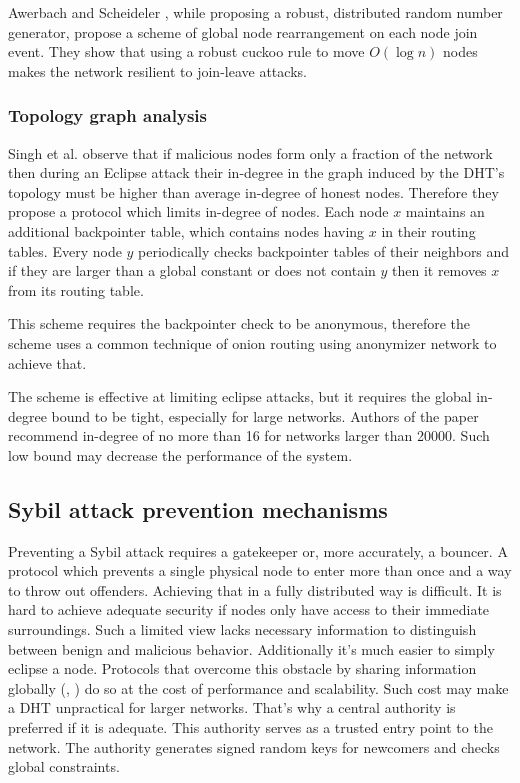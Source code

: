   Awerbach and Scheideler \cite{awe10}, while proposing a robust, distributed
  random number generator, propose a scheme of global node rearrangement on each
  node join event. They show that using a robust cuckoo rule to move $O(\log n)$
  nodes makes the network resilient to join-leave attacks.

  \subsubsection{Topology graph analysis}
  Singh et al. \cite{sin06} observe that if malicious nodes form only a
  fraction of the network then during an Eclipse attack their in-degree in the
  graph induced by the DHT's topology must be higher than average in-degree of
  honest nodes. Therefore they propose a protocol which limits in-degree of
  nodes. Each node $x$ maintains an additional backpointer table, which contains
  nodes having $x$ in their routing tables. Every node $y$ periodically checks
  backpointer tables of their neighbors and if they are larger than a global
  constant or does not contain $y$ then it removes $x$ from its routing table.

  This scheme requires the backpointer check to be anonymous, therefore the
  scheme uses a common technique of onion routing using anonymizer network to
  achieve that.

  The scheme is effective at limiting eclipse attacks, but it requires the
  global in-degree bound to be tight, especially for large networks. Authors of
  the paper recommend in-degree of no more than 16 for networks larger than
  20000. Such low bound may decrease the performance of the system.

\subsection{Sybil attack prevention mechanisms}
  Preventing a Sybil attack requires a gatekeeper or, more accurately, a
  bouncer. A protocol which prevents a single physical node to enter more than
  once and a way to throw out offenders. Achieving that in a fully distributed
  way is difficult. It is hard to achieve adequate security if nodes only have
  access to their immediate surroundings.  Such a limited view lacks necessary
  information to distinguish between benign and malicious behavior.
  Additionally it's much easier to simply eclipse a node. Protocols that
  overcome this obstacle by sharing information globally (\cite{cas02},
  \cite{wan05}) do so at the cost of performance and scalability. Such cost
  may make a DHT unpractical for larger networks. That's why a central authority
  is preferred if it is adequate. This authority serves as a trusted entry point
  to the network. The authority generates signed random keys for newcomers and
  checks global constraints.


